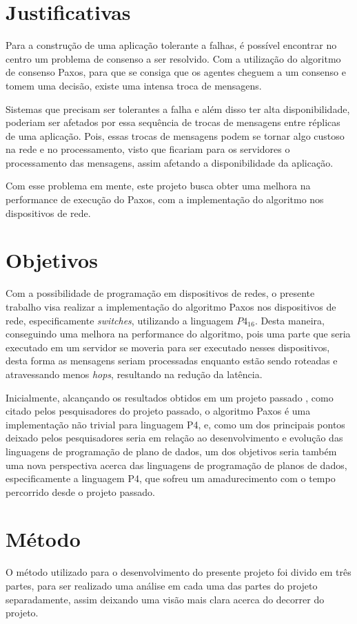 \documentclass[12pt,
openright, 
oneside,
a4paper,
brazil]{facom-ufu-abntex2}
\theoremstyle{definition}
\begin{document}
\section{Justificativas}
Para a construção de uma aplicação tolerante a falhas, é possível encontrar no centro um
problema de consenso a ser resolvido. Com a utilização do algoritmo de consenso Paxos,
para  que se consiga que os agentes cheguem a um consenso e tomem uma decisão, 
existe uma intensa troca de mensagens.

Sistemas que precisam ser tolerantes a falha e além disso ter alta disponibilidade, 
poderiam ser afetados por essa sequência de trocas de mensagens entre réplicas de uma aplicação.
Pois, essas trocas de mensagens podem se tornar algo custoso na rede e no processamento,
visto que ficariam para os servidores o processamento das mensagens, assim afetando a 
disponibilidade da aplicação. 

Com esse problema em mente, este projeto busca obter uma melhora na performance de execução
do Paxos, com a implementação do algoritmo nos dispositivos de rede.


\section{Objetivos}
Com a possibilidade de programação em dispositivos de redes, o presente trabalho 
visa realizar a implementação do algoritmo Paxos nos dispositivos
de rede, especificamente \textit{switches}, utilizando a linguagem $P4_{16}$. 
Desta maneira, conseguindo uma melhora na performance do algoritmo, pois uma parte 
que seria executado em um servidor se moveria para ser executado nesses dispositivos, desta
forma as mensagens seriam processadas enquanto estão sendo roteadas e atravessando menos
\textit{hops}, resultando na redução da latência.

Inicialmente, alcançando os resultados obtidos em um projeto passado \citep{dang2016paxos},
como citado pelos pesquisadores do projeto passado, o algoritmo Paxos é uma implementação
não trivial para linguagem P4, e, como um dos principais pontos deixado pelos pesquisadores
seria em relação ao desenvolvimento e evolução das linguagens de programação de plano de dados,
um dos objetivos seria também uma nova perspectiva acerca das linguagens de programação de 
planos de dados, especificamente a linguagem P4, que sofreu um amadurecimento com o tempo 
percorrido desde o projeto passado.

\section{Método}
O método utilizado para o desenvolvimento do presente projeto foi divido em três partes, para
ser realizado uma análise em cada uma das partes do projeto separadamente, assim deixando uma
visão mais clara acerca do decorrer do projeto.
\end{document}
